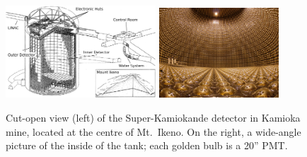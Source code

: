 \begin{figure}
	\centering
	\includegraphics[width=0.50\textwidth]{pics/superk-schematic-tags.png}
	\hfill
	\includegraphics[width=0.40\textwidth]{pics/superk-internal.jpeg}
	\caption[View of the Super-Kamiokande detector]%
	{Cut-open view (left) of the Super-Kamiokande detector in Kamioka mine, %
	located at the centre of Mt.\ Ikeno.
	On the right, a wide-angle picture of the inside of the tank; each golden bulb is a 20'' PMT.}
	\label{fig:sk_scheme}
\end{figure}


